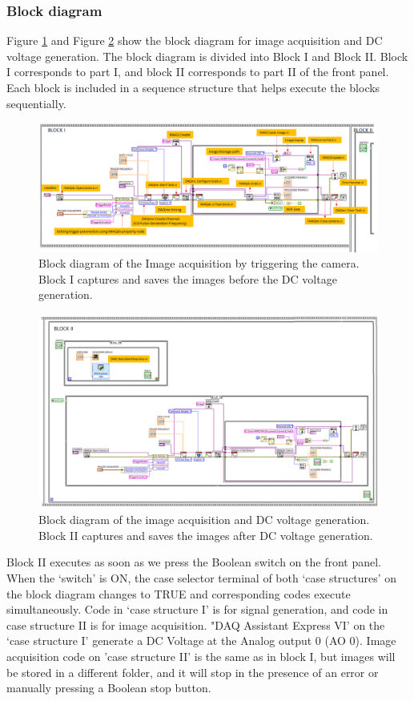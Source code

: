\documentclass[journal=jacsat,manuscript=article]{achemso}
\begin{document}
\subsubsection{Block diagram}
Figure \ref{fig:ex4} and Figure \ref{fig:ex5} show the block diagram
for image acquisition and DC voltage generation. The block diagram is
divided into Block I and Block II. Block I corresponds to part I, and
block II corresponds to part II of the front panel. Each block is
included in a sequence structure that helps execute the blocks
sequentially. 
\begin{figure}[H]
    \centering
    \includegraphics[width=1.3\linewidth,angle=90 ]{BLOCK1.png}
    \caption{Block diagram of the Image acquisition by triggering the
      camera. Block I captures and saves the images before the DC
      voltage generation.}
    \label{fig:ex4}
\end{figure}
\begin{figure}[H]
    \centering
    \includegraphics[width=1.3\linewidth,angle=90]{Block2.png}
    \caption{Block diagram of the image acquisition and DC voltage
      generation. Block II captures and saves the images after DC
      voltage generation.}
    \label{fig:ex5}
\end{figure}
Block II executes as soon as we press the Boolean switch on the front
panel. When the ‘switch’ is ON, the case selector terminal of both
‘case structures’ on the block diagram changes to TRUE and
corresponding codes execute simultaneously. Code in ‘case structure I’
is for signal generation, and code in case structure II is for image
acquisition. "DAQ Assistant Express VI' on the ‘case structure I’
generate a DC Voltage at the Analog output 0 (AO 0). Image acquisition
code on 'case structure II' is the same as in block I, but images will
be stored in a different folder, and it will stop in the presence of
an error or manually pressing a Boolean stop button.
\end{document}
